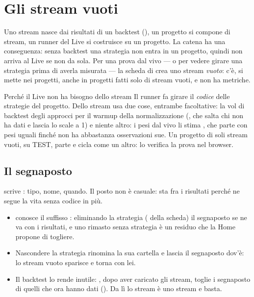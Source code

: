 \section{Gli stream vuoti}\label{sez:stream-vuoti}

Uno stream nasce dai risultati di un backtest (), un
progetto si compone di stream, un runner del Live si costruisce su un
progetto. La catena ha una conseguenza: senza backtest una strategia non entra
in un progetto, quindi non arriva al Live se non da sola. Per una prova dal
vivo --- o per vedere girare una strategia prima di averla misurata --- la
scheda di  crea uno stream \emph{vuoto}: c'è, si mette nei
progetti, anche in progetti fatti solo di stream vuoti, e non ha metriche.

\begin{perche}{Perché il Live non ha bisogno dello stream}
Il runner fa girare il \emph{codice} delle strategie del progetto. Dello
stream usa due cose, entrambe facoltative: la vol di backtest degli approcci
per il warmup della normalizzazione (, che salta
chi non ha dati e lascia lo scale a 1) e niente altro: i pesi dal vivo li
stima , che parte con pesi uguali finché non ha
abbastanza osservazioni sue. Un progetto di soli stream vuoti, su TEST, parte
e cicla come un altro: lo verifica la prova nel browser.
\end{perche}

\subsection{Il segnaposto}

 scrive
: tipo, nome, quando. Il
posto non è casuale: sta fra i risultati perché ne segue la vita senza codice
in più.

\begin{itemize}
  \item {} conosce il suffisso :
        eliminando la strategia ( della scheda) il segnaposto se
        ne va con i risultati, e uno rimasto senza strategia è un residuo che
        la Home propone di togliere.
  \item Nascondere la strategia rinomina la sua cartella e lascia il
        segnaposto dov'è: lo stream vuoto sparisce e torna con lei.
  \item Il backtest lo rende inutile: , dopo aver
        caricato gli stream, toglie i segnaposto di quelli che ora hanno dati
        (). Da lì lo stream è uno stream e basta.
\end{itemize}

